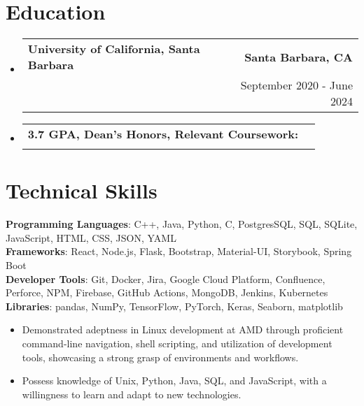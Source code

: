 \documentclass[letterpaper,11pt]{article}
\makeatletter
\newcommand{\resumeItem}[1]{
  \item\small{
    {#1 \vspace{-2pt}}
  }
}
\newcommand{\resumeSubheading}[4]{
  \vspace{-2pt}\item
    \begin{tabular*}{0.97\textwidth}[t]{l@{\extracolsep{\fill}}r}
      \textbf{#1} & #2 \\
      \text{#3} & #4 \\
    \end{tabular*}\vspace{-7pt}
}
\newcommand{\resumeSubHeadingListStart}{\begin{itemize}[leftmargin=0.15in, label={}]}
\newcommand{\resumeSubHeadingListEnd}{\end{itemize}}
\newcommand{\resumeItemListStart}{\begin{itemize}}
\newcommand{\resumeItemListEnd}{\end{itemize}\vspace{-5pt}}
\makeatother
\begin{document}
\section{\textbf{Education}}
  \resumeSubHeadingListStart
    \resumeSubheading
      {University of California, Santa Barbara}{\textbf{Santa Barbara, CA}}
      {Bachelor of Science in Computer Engineering}{September 2020 - June 2024}
    \resumeSubheading
      {3.7 GPA, Dean's Honors, Relevant Coursework:}{}
      {\small{Data Structures, Algorithms, Operating Systems, Full Stack Web Development, UI/UX Design}}{}
  \resumeSubHeadingListEnd

%
\section{\textbf{Technical Skills}}
 \begin{itemize}[leftmargin=0.15in, label={}]
    \small{\item{
     \textbf{Programming Languages}{: C++, Java, Python, C, PostgresSQL, SQL, SQLite, JavaScript, HTML, CSS, JSON, YAML} \\
     \textbf{Frameworks}{: React, Node.js, Flask, Bootstrap, Material-UI, Storybook, Spring Boot} \\
     \textbf{Developer Tools}{: Git, Docker, Jira, Google Cloud Platform, Confluence, Perforce, NPM, Firebase, GitHub Actions, MongoDB, Jenkins, Kubernetes } \\
     \textbf{Libraries}{: pandas, NumPy, TensorFlow, PyTorch, Keras, Seaborn, matplotlib } \\
     \resumeItemListStart
            \resumeItem{Demonstrated adeptness in Linux development at AMD through proficient command-line navigation, shell scripting, and utilization of development tools, showcasing a strong grasp of environments and workflows.}
            \resumeItem{Possess knowledge of Unix, Python, Java, SQL, and JavaScript, with a willingness to learn and adapt to new technologies.}
    \resumeItemListEnd
    }}
 \end{itemize}


\end{document}
